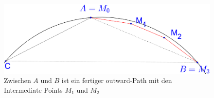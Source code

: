 \documentclass[a4paper,twoside]{IEEEtran}
\begin{document}
\begin{figure}[h!]
\centering
\includegraphics[width=1\linewidth]{outward_path_fertig.eps}
\caption{Zwischen $A $ und $B $ ist ein fertiger outward-Path mit den Intermediate Points $M_1 $ und $M_2 $}
\label{fig:outward_path_fertig}
\end{figure}




\end{document}
